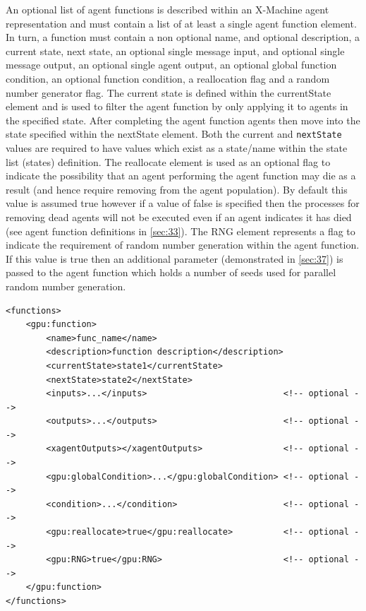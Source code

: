\documentclass[11pt, a4paper, onecolumn, oneside]{report}
\begin{document}
An optional list of agent functions is described within an X-Machine agent representation and must contain a list of at least a single agent function element.
In turn, a function must contain a non optional name, and optional description, a current state, next state, an optional single message input, and optional single message output, an optional single agent output, an optional global function condition, an optional function condition, a reallocation flag and a random number generator flag.
The current state is defined within the currentState element and is used to filter the agent function by only applying it to agents in the specified state.
After completing the agent function agents then move into the state specified within the nextState element.
Both the current and \texttt{nextState} values are required to have values which exist as a state/name within the state list (states) definition.
The reallocate element is used as an optional flag to indicate the possibility that an agent performing the agent function may die as a result (and hence require removing from the agent population).
By default this value is assumed true however if a value of false is specified then the processes for removing dead agents will not be executed even if an agent indicates it has died (see agent function definitions in \cref{sec:33}).
The RNG element represents a flag to indicate the requirement of random number generation within the agent function.
If this value is true then an additional parameter (demonstrated in \cref{sec:37}) is passed to the agent function which holds a number of seeds used for parallel random number generation.


\begin{verbatim}
<functions>
    <gpu:function>
        <name>func_name</name>
        <description>function description</description>
        <currentState>state1</currentState>
        <nextState>state2</nextState>
        <inputs>...</inputs>                           <!-- optional -->
        <outputs>...</outputs>                         <!-- optional -->
        <xagentOutputs></xagentOutputs>                <!-- optional -->
        <gpu:globalCondition>...</gpu:globalCondition> <!-- optional -->
        <condition>...</condition>                     <!-- optional -->
        <gpu:reallocate>true</gpu:reallocate>          <!-- optional -->
        <gpu:RNG>true</gpu:RNG>                        <!-- optional -->
    </gpu:function>
</functions>
\end{verbatim}
\end{document}
